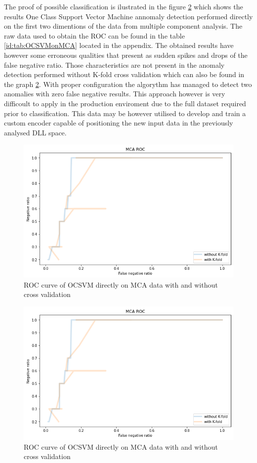 \documentclass[a4paper,twoside,12pt]{book}
\begin{document}
The proof of possible classification is ilustrated in the figure \ref{fig:mcaroc} which shows the 
results One Class Support Vector Machine annomaly detection performed directly on the first two dimentions 
of the data from multiple component analysis. The raw data used to obtain the ROC can be found in the table
\ref{id:tab:OCSVMonMCA} located in the appendix. The obtained results have however some erroneous qualities that
present as sudden spikes and drops of the false negative ratio. Those characteristics are not present in the 
anomaly detection performed without K-fold cross validation which can also be found in the graph \ref{fig:mcaroc}. 
With proper configuration the algorythm has managed to detect 
two anomalies with zero false negative results. This approach however is very difficoult to apply in the 
production enviroment due to the full dataset required prior to classification. This data may be however 
utilised to develop and train a custom encoder capable of positioning the new input data in the previously 
analysed DLL space.  

\begin{figure}
	\centering
	\includegraphics[scale=0.9]{images/MCAROCbothKFandNot.PNG}
	\caption{ROC curve of OCSVM directly on MCA data with and without cross validation}
	\label{fig:mcaroc}
 \end{figure}

 \begin{figure}
	\centering
	\includegraphics[scale=0.9]{images/MCAROCbothKFandNot.PNG}
	\caption{ROC curve of OCSVM directly on MCA data with and without cross validation}
	\label{fig:mcaroc}
 \end{figure}
\end{document}
